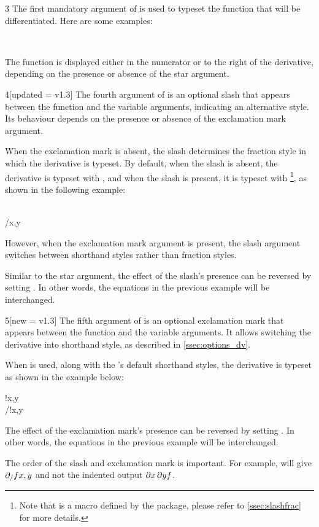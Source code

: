 \begin{function}
	\begin{argument}{3}
		The first mandatory argument of  is used to typeset the function that will be differentiated. Here are some examples:
		\begin{example}
			 \\
		\end{example}
		The function is displayed either in the numerator or to the right of the derivative, depending on the presence or absence of the star argument.
	\end{argument}
	
	\begin{argument}{4}[updated = v1.3]
		The fourth argument of  is an optional slash that appears between the function and the variable arguments, indicating an alternative style. Its behaviour depends on the presence or absence of the exclamation mark argument.
		
		When the exclamation mark is absent, the slash determines the fraction style in which the derivative is typeset. By default, when the slash is absent, the derivative is typeset with , and when the slash is present, it is typeset with \footnote{Note that  is a macro defined by the package, please refer to \cref{ssec:slashfrac} for more details.\label{foot:sfrac}}, as shown in the following example:
		\begin{example}
			\pdv{f}{x,y} \\
			\pdv{f}/{x,y}
		\end{example}
		However, when the exclamation mark argument is present, the slash argument switches between shorthand styles rather than fraction styles.
		
		Similar to the star argument, the effect of the slash's presence can be reversed by setting . In other words, the equations in the previous example will be interchanged.
	\end{argument}
	
	\begin{argument}{5}[new = v1.3]
		The fifth argument of  is an optional exclamation mark that appears between the function and the variable arguments. It allows switching the derivative into shorthand style, as described in \cref{ssec:options_dv}.
		
		When  is used, along with the 's default shorthand styles, the derivative is typeset as shown in the example below:
		\begin{example}
			!{x,y} \\
			\pdv{f}/!{x,y}
		\end{example}
		The effect of the exclamation mark's presence can be reversed by setting . In other words, the equations in the previous example will be interchanged.
		\begin{note}
			The order of the slash and exclamation mark is important. For example, \targ{!}\targ{/} will give $\pdv{f}!/{x,y}$ and not the indented output $\pdv{f}/!{x,y}$.
		\end{note}
	\end{argument}
	

\end{function}
